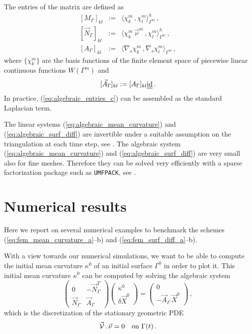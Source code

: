 The entries of the matrix are defined as
\begin{eqnarray}
\left[ M_\Gamma \right]_{kl} & := & \langle \chi_k^m \, , \chi_l^m
\rangle_{\Gamma^m}^h\,,\label{eq:algebraic_entries_a} \\
\left[ \vec N_\Gamma \right]_{kl} & := & \langle \chi_k^m \, \vec \nu^m\,,
\chi_l^m \rangle_{\Gamma^m}^h\,,\label{eq:algebraic_entries_b} \\
\left[ A_\Gamma \right]_{kl} & := & \langle \nabla_s \chi_k^m \, , \nabla_s
\chi_l^m \rangle_{\Gamma^m}\,,\label{eq:algebraic_entries_c}
\end{eqnarray}
where $\{\chi_k^m\}$ are the basis functions of the finite element space of
piecewise linear continuous functions $W(\Gamma^m)$ and
\begin{equation}\label{eq:algebraic_entries_d}
[\vec A_\Gamma]_{kl} := [A_\Gamma]_{kl} \mat \id\,.
\end{equation}
In practice, (\ref{eq:algebraic_entries_c}) can be assembled as the standard
Laplacian term.

The linear systems (\ref{eq:algebraic_mean_curvature}) and
(\ref{eq:algebraic_surf_diff}) are invertible under a suitable assumption on the
triangulation at each time step, see \cite{gflows3d}. The algebraic system
(\ref{eq:algebraic_mean_curvature}) and (\ref{eq:algebraic_surf_diff}) are
very small also for fine meshes. Therefore they can be solved very efficiently
with a sparse factorization package such as \verb|UMFPACK|, see \cite{Davis04}.

\section{Numerical results}\label{sec:geometric_pdes_results}
Here we report on several numerical examples to benchmark the schemes
(\ref{eq:fem_mean_curvature_a}--b) and (\ref{eq:fem_surf_diff_a}--b).

With a view towards our numerical simulations, we want to be able to compute
the initial mean curvature $\kappa^0$ of an initial surface $\Gamma^0$ in
order to plot it. This initial mean curvature $\kappa^0$ can be computed by
solving the algebraic system
\begin{equation}\label{eq:algebraic_initial_curvature}
\begin{pmatrix}
0 & -\vec N_\Gamma^{T} \\
\vec N_\Gamma & \vec A_\Gamma
\end{pmatrix}
\begin{pmatrix}
\kappa^0 \\
\delta \vec X^0
\end{pmatrix}
=
\begin{pmatrix}
0 \\
- \vec A_\Gamma \, \vec X^0
\end{pmatrix}
\,,
\end{equation}
which is the discretization of the stationary geometric PDE
\begin{equation}
\vec{\mathcal{V}}\,.\,\vec\nu=0\quad\mbox{on }\Gamma(t)\,.
\end{equation}

